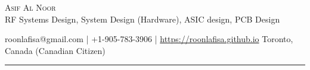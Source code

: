 \documentclass[10pt, Letter]{article}
\newcommand{\metasection}[2]
{
\footnotesize{#2} \hspace*{\fill} \footnotesize{#1}\\[1pt]
}
\begin{document}
\pagestyle{fancy}	








\vspace{-8pt}
\begin{center}
	\huge \textsc{Asif Al Noor} \\[2pt]
	\small RF Systems Design, System Design (Hardware), ASIC design, PCB Design
\end{center}



\vspace{6pt}


\vspace{-10pt}
\metasection{Toronto, Canada (Canadian Citizen)}{roonlafisa@gmail.com | +1-905-783-3906 | \href{https://roonlafisa.github.io}{https://roonlafisa.github.io}}
\vspace{-6pt}
\textcolor{softcol}{\hrule}


\normalsize

\end{document}
